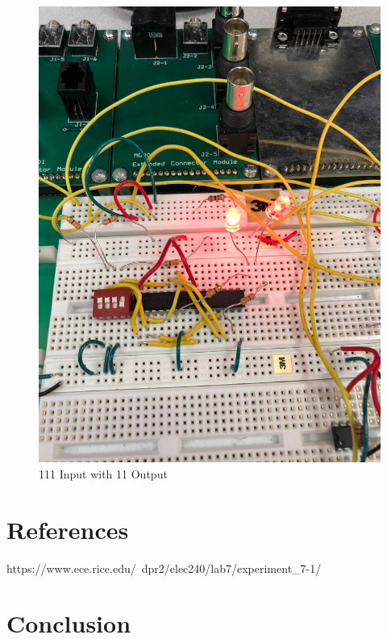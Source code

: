 \documentclass[10pt]{article}
\begin{document}
\begin{centering}
	\begin{figure} [H]
		\centering
		\includegraphics[scale=0.07]{images/111led.jpg}
		\caption{111 Input with 11 Output}
	\end{figure}
\end{centering}

\medskip


\section{References}
https://www.ece.rice.edu/~dpr2/elec240/lab7/experiment\_7-1/

\medskip



\section{Conclusion}
\end{document}
